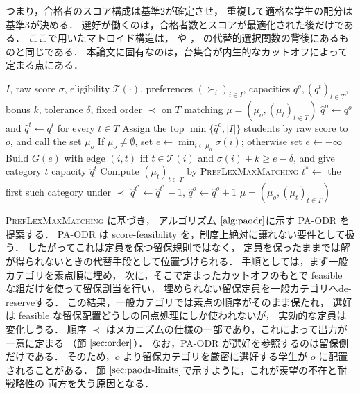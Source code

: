 \documentclass[
    12pt,          %
    a4paper,       %
    oneside,       %
    onecolumn,     %
    titlepage,     %
    final          %
]{jreport} %
\newcommand{\refsection}[1]{節 $\ref{#1}$}
\newcommand{\refalgorithm}[1]{アルゴリズム $\ref{#1}$}
\renewcommand{\T}{\mathcal{T}}   %
\begin{document}
つまり，合格者のスコア構成は基準2が確定させ，
重複して適格な学生の配分は基準3が決める．
選好が働くのは，合格者数とスコアが最適化された後だけである．
ここで用いたマトロイド構造は，\citet{Flei03a} や
\citet{GKK+17a}，\citet{KoSo16a} の代替的選択関数の背後にあるものと同じである．
本論文に固有なのは，台集合が内生的なカットオフによって定まる点にある．

\begin{algorithm}[htbp]
\caption{Preference-Aware Overlapping De-Reservation（PA-ODR）}
\label{alg:paodr}
\begin{algorithmic}[1]
\Require $I$, raw score $\sigma$, eligibility $\T(\cdot)$, preferences $(\succ_i)_{i\in I}$,
         capacities $q^o,(q^t)_{t\in T}$, bonus $k$, tolerance $\delta$, fixed order $\prec$ on $T$
\Ensure matching $\mu=(\mu_o,(\mu_t)_{t\in T})$
\State $\hat q^o\gets q^o$ and $\hat q^t\gets q^t$ for every $t\in T$
    \State Assign the top $\min\{\hat q^o,|I|\}$ students by raw score to $o$, and call the set $\mu_o$
    \State If $\mu_o\neq\emptyset$, set $e\gets\min_{i\in\mu_o}\sigma(i)$; otherwise set $e\gets-\infty$
    \State Build $G(e)$ with edge $(i,t)$ iff $t\in\T(i)$ and $\sigma(i)+k\ge e-\delta$,
           and give category $t$ capacity $\hat q^t$
    \State Compute $(\mu_t)_{t\in T}$ by \textsc{PrefLexMaxMatching}
        \State $t^\ast\gets$ the first such category under $\prec$
        \State $\hat q^{t^\ast}\gets\hat q^{t^\ast}-1$, $\hat q^o\gets\hat q^o+1$
    \Else
        \State \Return $\mu=(\mu_o,(\mu_t)_{t\in T})$
    \EndIf
\EndWhile
\end{algorithmic}
\end{algorithm}

\textsc{PrefLexMaxMatching} に基づき，
\refalgorithm{alg:paodr}に示す PA-ODR を提案する．
PA-ODR は score-feasibility を，制度上絶対に譲れない要件として扱う．
したがってこれは定員を保つ留保規則ではなく，
定員を保ったままでは解が得られないときの代替手段として位置づけられる．
手順としては，まず一般カテゴリを素点順に埋め，
次に，そこで定まったカットオフのもとで feasible な組だけを使って留保割当を行い，
埋められない留保定員を一般カテゴリへde-reserveする．
この結果，一般カテゴリでは素点の順序がそのまま保たれ，
選好は feasible な留保配置どうしの同点処理にしか使われないが，
実効的な定員は変化しうる．
順序 $\prec$ はメカニズムの仕様の一部であり，これによって出力が一意に定まる
（\refsection{sec:order}）．
なお，PA-ODR が選好を参照するのは留保側だけである．
そのため，$o$ より留保カテゴリを厳密に選好する学生が $o$ に配置されることがある．
\refsection{sec:paodr-limits}で示すように，これが羨望の不在と耐戦略性の
両方を失う原因となる．
\end{document}
